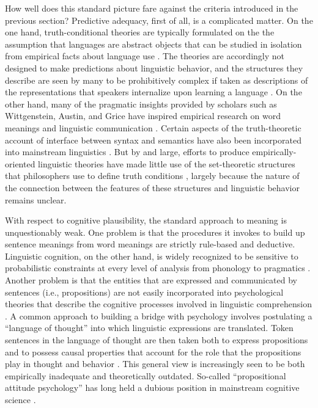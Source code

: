 How well does this standard picture fare against the criteria introduced in the previous section? Predictive adequacy, first of all, is a complicated matter. On the one hand, truth-conditional theories are typically formulated on the the assumption that languages are abstract objects that can be studied in isolation from empirical facts about language use \citep[][]{Lewis:1970, Jackendoff:2002, Speaks:2014}. The theories are accordingly not designed to make predictions about linguistic behavior, and the structures they describe are seen by many to be prohibitively complex if taken as descriptions of the representations that speakers internalize upon learning a language \citep{Jackendoff:2002,LiangPotts:2015}. On the other hand, many of the pragmatic insights provided by scholars such as Wittgenstein, Austin, and Grice have inspired empirical research on word meanings and linguistic communication \citep{Pinker:1994,Bloom:2001,Harley:2014}. Certain aspects of the truth-theoretic account of interface between syntax and semantics have also been incorporated into mainstream linguistics \citep{SmolenskyLegendre:2006}. But by and large, efforts to produce empirically-oriented linguistic theories have made little use of the set-theoretic structures that philosophers use to define truth conditions \citep{Jackendoff:2002,Harley:2014}, largely because the nature of the connection between the features of these structures and linguistic behavior remains unclear. 

With respect to cognitive plausibility, the standard approach to meaning is unquestionably weak. One problem is that the procedures it invokes to build up sentence meanings from word meanings are strictly rule-based and deductive. Linguistic cognition, on the other hand, is widely recognized to be sensitive to probabilistic constraints at every level of analysis from phonology to pragmatics  \citep{SmolenskyLegendre:2006,Christiansen:2015,ChaterManning:2006,Seidenberg:1997}. Another problem is that the entities that are expressed and communicated by sentences (i.e., propositions) are not easily incorporated into psychological theories that describe the cognitive processes involved in linguistic comprehension \citep[][Ch. 5]{Dennett:1987}. A common approach to building a bridge with psychology involves postulating a ``language of thought'' into which linguistic expressions are translated. Token sentences in the language of thought are then taken both to express propositions and to possess causal properties that account for the role that the propositions play in thought and behavior \citep{Fodor:1998}. This general view is increasingly seen to be both empirically inadequate and theoretically outdated. So-called ``propositional attitude psychology'' has long held a dubious position in mainstream cognitive science \citep{Dennett:1987,Churchland:1993}.

